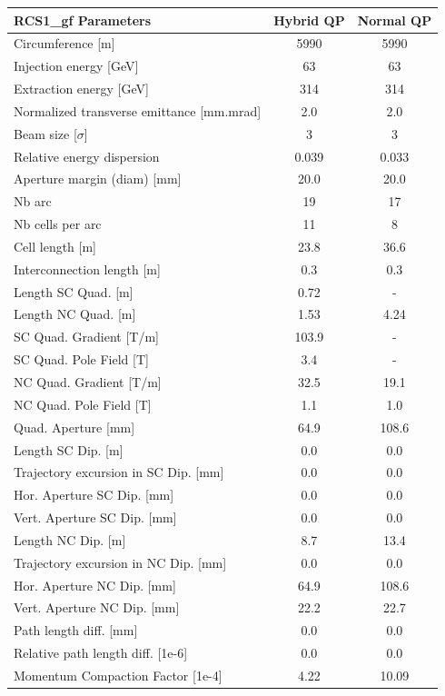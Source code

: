 \begin{tabular}{lcc}
\toprule
RCS1_gf Parameters & Hybrid QP & Normal QP \\
\midrule
Circumference [m] & 5990 & 5990 \\
Injection energy [GeV] & 63 & 63 \\
Extraction energy [GeV] & 314 & 314 \\
Normalized transverse emittance [mm.mrad] & 2.0 & 2.0 \\
Beam size [$\sigma$] & 3 & 3 \\
Relative energy dispersion & 0.039 & 0.033 \\
Aperture margin (diam) [mm] & 20.0 & 20.0 \\
Nb arc & 19 & 17 \\
Nb cells per arc & 11 & 8 \\
Cell length [m] & 23.8 & 36.6 \\
Interconnection length [m] & 0.3 & 0.3 \\
Length SC Quad. [m] & 0.72 & - \\
Length NC Quad. [m] & 1.53 & 4.24 \\
SC Quad. Gradient [T/m] & 103.9 & - \\
SC Quad. Pole Field [T] & 3.4 & - \\
NC Quad. Gradient [T/m] & 32.5 & 19.1 \\
NC Quad. Pole Field [T] & 1.1 & 1.0 \\
Quad. Aperture [mm] & 64.9 & 108.6 \\
Length SC Dip. [m] & 0.0 & 0.0 \\
Trajectory excursion in SC Dip. [mm] & 0.0 & 0.0 \\
Hor. Aperture SC Dip. [mm] & 0.0 & 0.0 \\
Vert. Aperture SC Dip. [mm] & 0.0 & 0.0 \\
Length NC Dip. [m] & 8.7 & 13.4 \\
Trajectory excursion in NC Dip. [mm] & 0.0 & 0.0 \\
Hor. Aperture NC Dip. [mm] & 64.9 & 108.6 \\
Vert. Aperture NC Dip. [mm] & 22.2 & 22.7 \\
Path length diff. [mm] & 0.0 & 0.0 \\
Relative path length diff. [1e-6] & 0.0 & 0.0 \\
Momentum Compaction Factor [1e-4] & 4.22 & 10.09 \\
\bottomrule
\end{tabular}
